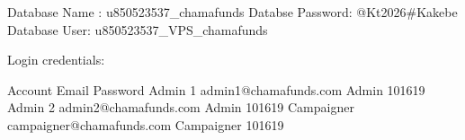 

Database Name : u850523537_chamafunds
Databse Password: @Kt2026#Kakebe
Database User: u850523537_VPS_chamafunds

Login credentials:

Account	Email	Password
Admin 1	admin1@chamafunds.com	Admin 101619
Admin 2	admin2@chamafunds.com	Admin 101619
Campaigner	campaigner@chamafunds.com	Campaigner 101619